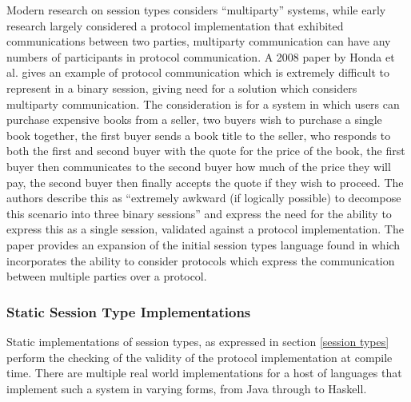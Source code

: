 \documentclass{article}
\begin{document}
	Modern research on session types considers ``multiparty'' systems, while early research largely considered a protocol implementation that exhibited communications between two parties, multiparty communication can have any numbers of participants in protocol communication. A 2008 paper by Honda et al.\cite{honda2008multiparty} gives an example of protocol communication which is extremely difficult to represent in a binary session, giving need for a solution which considers multiparty  communication. The consideration is for a system in which users can purchase expensive books from a seller, two buyers wish to purchase a single book together, the first buyer sends a book title to the seller, who responds to both the first and second buyer with the quote for the price of the book, the first buyer then communicates to the second buyer how much of the price they will pay, the second buyer then finally accepts the quote if they wish to proceed. The authors describe this as ``extremely awkward (if logically possible) to decompose this scenario into three binary sessions'' and express the need for the ability to express this as a single session, validated against a protocol implementation. The paper provides an expansion of the initial session types language found in\cite{honda1998language, takeuchi1994interaction} which incorporates the ability to consider protocols which express the communication between multiple parties over a protocol.
	\subsubsection{Static Session Type Implementations}
	Static implementations of session types, as expressed in section \ref{session types} perform the checking of the validity of the protocol implementation at compile time. There are multiple real world implementations for a host of languages that implement such a system in varying forms, from Java through to Haskell\cite{lindley2016embedding}. 
	
\end{document}
